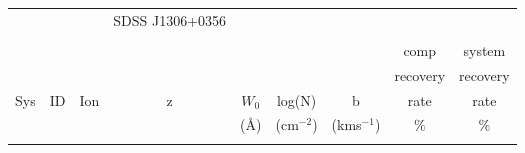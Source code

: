 \documentclass[12pt]{article}
\begin{document}
\begin{footnotesize}
\begin{longtable}{ c c c c c c c c c}  
			&	   &                           &            \Large{SDSS J1306+0356}    & 	& 					&							  	\\     
	     &        	&                           &				&				   &	                    &         	     		 	&  \\              
\hline                                                                                                                                                   
\hline                                                                                                                                                   
     	        &     	&                           &				&				   &	                    &         	     		 	& 		comp		& 		system	  	 \\    
                                                                                                                                                         
        &     	&                           &				&				   &	                    &         	     		 	& 		recovery			& 		recovery  	 \\    
   Sys  & ID  &   Ion     				   &  z 			&      $W_0$       &     log(N)				&    b						&   	rate	&   	rate   \\                      
          &         &                           &			&     	(\AA)		 &    (cm$^{-2}$)     &    (kms$^{ -1}$)	&        	$\%$	       & $\%$	\\         
		&	   &                           &            & 	& 					&							  	& \\                                                                 
                                                                                                                                                         

\end{longtable}
\end{footnotesize}
\end{document}

